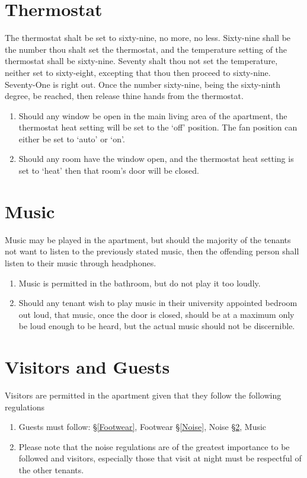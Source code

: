 \documentclass[10pt]{article}
\begin{document}
\section{Thermostat} \label{Thermostat}
The thermostat shalt be set to sixty-nine, no more, no less. Sixty-nine shall be the number thou shalt set the thermostat, and the temperature setting of the thermostat shall be sixty-nine. Seventy shalt thou not set the temperature, neither set to sixty-eight, excepting that thou then proceed to sixty-nine. Seventy-One is right out. Once the number sixty-nine, being the sixty-ninth degree, be reached, then release thine hands from the thermostat.
\begin{enumerate}
	\item Should any window be open in the main living area of the apartment, the thermostat heat setting will be set to the ‘off’ position. The fan position can either be set to ‘auto’ or ‘on’.
	\item Should any room have the window open, and the thermostat heat setting is set to ‘heat’ then that room’s door will be closed.
	
\end{enumerate}

\section{Music} \label{Music}
Music may be played in the apartment, but should the majority of the tenants not want to listen to the previously stated music, then the offending person shall listen to their music through headphones.
\begin{enumerate}
\item Music is permitted in the bathroom, but do not play it too loudly.
\item Should any tenant wish to play music in their university appointed bedroom out loud, that music, once the door is closed, should be at a maximum only be loud enough to be heard, but the actual music should not be discernible. 
\end{enumerate}

\section{Visitors and Guests} \label{Visitors and Guests}
Visitors are permitted in the apartment given that they follow the following regulations

\begin{enumerate}
	\item Guests must follow:
	\subitem \S \ref{Footwear}, Footwear
	\subitem \S \ref{Noise}, Noise
	\subitem \S \ref{Music}, Music
	\item Please note that the noise regulations are of the greatest importance to be followed and visitors, especially those that visit at night must be respectful of the other tenants.
	
\end{enumerate}
\end{document}
